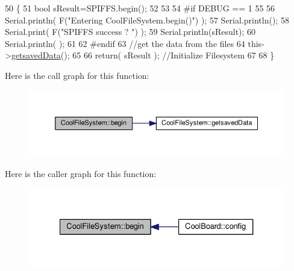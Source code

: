 \begin{DoxyCode}
50 \{
51     \textcolor{keywordtype}{bool} sResult=SPIFFS.begin();
52     
53 
54 \textcolor{preprocessor}{#if DEBUG == 1}
55 
56     Serial.println( F(\textcolor{stringliteral}{"Entering CoolFileSystem.begin()"}) );
57     Serial.println();   
58     Serial.print( F(\textcolor{stringliteral}{"SPIFFS success ? "}) );
59     Serial.println(sResult);
60     Serial.println(  );
61 
62 \textcolor{preprocessor}{#endif}
63     \textcolor{comment}{//get the data from the files}
64     this->\hyperlink{class_cool_file_system_a70701d05e811604af1b531f4f6dc69ed}{getsavedData}();
65 
66     \textcolor{keywordflow}{return}( sResult  );                                   \textcolor{comment}{//Initialize Filesystem}
67 
68 \}
\end{DoxyCode}
Here is the call graph for this function\+:\nopagebreak
\begin{figure}[H]
\begin{center}
\leavevmode
\includegraphics[width=350pt]{db/d0c/class_cool_file_system_a6ba6f666ed4c530174f8569d2c636748_cgraph}
\end{center}
\end{figure}
Here is the caller graph for this function\+:\nopagebreak
\begin{figure}[H]
\begin{center}
\leavevmode
\includegraphics[width=327pt]{db/d0c/class_cool_file_system_a6ba6f666ed4c530174f8569d2c636748_icgraph}
\end{center}
\end{figure}
\mbox{\label{class_cool_file_system_a13f2958f5b87757c31fc53797a30d23a}} 
